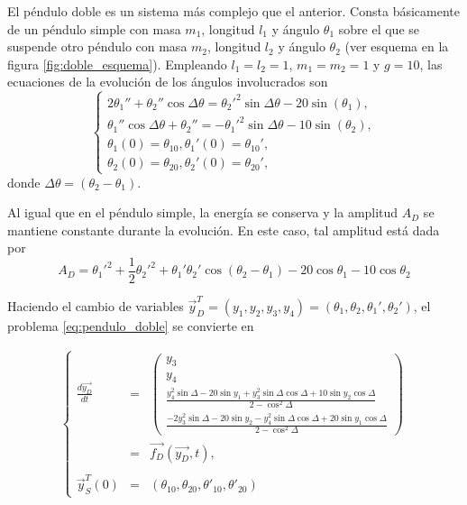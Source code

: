 \documentclass[aps,prb,twocolumn,superscriptaddress,floatfix,longbibliography,10pt]{revtex4-2}
\newif\ifptitle
\newif\ifpnumber
\newcounter{para}
\newcommand\ptitle[1]{\par\refstepcounter{para}
{\ifpnumber{\noindent\textcolor{lightgray}{\textbf{\thepara}}\indent}\fi}
{\ifptitle{\textbf{[{#1}]}}\fi}}
\begin{document}
El péndulo doble es un sistema más complejo que el anterior. Consta básicamente de un péndulo simple con masa $m_1$, longitud $l_1$ y ángulo $\theta_1$ sobre el que se suspende otro péndulo con masa $m_2$, longitud $l_2$ y ángulo $\theta_2$ (ver esquema en la figura \ref{fig:doble_esquema}). Empleando $l_1 = l_2 = 1$, $m_1 = m_2 = 1$ y $g = 10$, las ecuaciones de la evolución de los ángulos involucrados son
\begin{equation}
\left\{\begin{matrix}
  2 \theta_1'' + \theta_2'' \cos{\Delta \theta} = \theta_2'^2 \sin{\Delta \theta} - 20 \sin{(\theta_1)}, \\
  \theta_1'' \cos{\Delta \theta} + \theta_2'' = - \theta_1'^2 \sin{\Delta \theta} - 10 \sin{(\theta_2)}, \\
  \theta_1(0) = \theta_{1 0}, \theta_1'(0) = \theta_{1 0}', \\
  \theta_2(0) = \theta_{2 0}, \theta_2'(0) = \theta_{2 0}',
  \end{matrix}\right.
  \label{eq:pendulo_doble}
\end{equation}
donde $\Delta \theta = (\theta_2 - \theta_1)$.

Al igual que en el péndulo simple, la energía se conserva y la amplitud $A_D$ se mantiene constante durante la evolución. En este caso, tal amplitud está dada por
\begin{equation}
  A_D = \theta_1'^2 + \frac{1}{2} \theta_2'^2 + \theta_1' \theta_2' \cos{(\theta_2 - \theta_1)} - 20 \cos{\theta_1} - 10 \cos{\theta_2}
  \label{eq:amplitud_doble}
\end{equation}

\ptitle{Ecuación vectorial del péndulo doble}
Haciendo el cambio de variables $\vec{y}_D^T = (y_1, y_2, y_3, y_4) = (\theta_1, \theta_2, \theta_1', \theta_2')$, el problema \ref{eq:pendulo_doble} se convierte en

\begin{eqnarray}
  \left\{\begin{matrix}
     \frac{d\vec{y_D}}{dt} & = &
      \begin{pmatrix}
        y_3 \\
        y_4 \\
        \frac{y_4^2 \sin{\Delta} - 20 \sin{y_1} + y_3^2 \sin{\Delta} \cos{\Delta} + 10 \sin{y_2} \cos{\Delta}}{  2 - \cos^2{\Delta}  } \\
        \frac{-2 y_3^2 \sin{\Delta} - 20 \sin{y_2} - y_4^2 \sin{\Delta} \cos{\Delta} + 20 \sin{y_1} \cos{\Delta}}{  2 - \cos^2{\Delta}  }
      \end{pmatrix} \\
     & = & \vec{f_D}(\vec{y_D},t),
    \\ \\
    \vec{y}_S^T(0) & = &
    (\theta_{1 0}, \theta_{2 0}, \theta'_{1 0}, \theta'_{2 0})
  \end{matrix}\right.
  \label{eq:pendulo_doble_vec}
\end{eqnarray}
\end{document}
